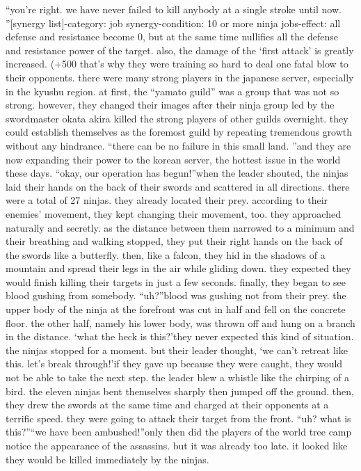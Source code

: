 “you’re right.
 we have never failed to kill anybody at a single stroke until now.
”[synergy list]-category: job synergy-condition: 10 or more ninja jobs-effect: all defense and resistance become 0, but at the same time nullifies all the defense and resistance power of the target.
 also, the damage of the ‘first attack’ is greatly increased.
 (+500%
 that’s why they were training so hard to deal one fatal blow to their opponents.
there were many strong players in the japanese server, especially in the kyushu region.
at first, the “yamato guild” was a group that was not so strong.
however, they changed their images after their ninja group led by the swordmaster okata akira killed the strong players of other guilds overnight.
 they could establish themselves as the foremost guild by repeating tremendous growth without any hindrance.
“there can be no failure in this small land.
”and they are now expanding their power to the korean server, the hottest issue in the world these days.
“okay, our operation has begun!”when the leader shouted, the ninjas laid their hands on the back of their swords and scattered in all directions.
there were a total of 27 ninjas.
 they already located their prey.
 according to their enemies’ movement, they kept changing their movement, too.
 they approached naturally and secretly.
as the distance between them narrowed to a minimum and their breathing and walking stopped, they put their right hands on the back of the swords like a butterfly.
 then, like a falcon, they hid in the shadows of a mountain and spread their legs in the air while gliding down.
they expected they would finish killing their targets in just a few seconds.
finally, they began to see blood gushing from somebody.
“uh?”blood was gushing not from their prey.
 the upper body of the ninja at the forefront was cut in half and fell on the concrete floor.
 the other half, namely his lower body, was thrown off and hung on a branch in the distance.
‘what the heck is this?’they never expected this kind of situation.
 the ninjas stopped for a moment.
but their leader thought, ‘we can’t retreat like this.
 let’s break through!’if they gave up because they were caught, they would not be able to take the next step.
the leader blew a whistle like the chirping of a bird.
 the eleven ninjas bent themselves sharply then jumped off the ground.
 then, they drew the swords at the same time and charged at their opponents at a terrific speed.
 they were going to attack their target from the front.
“uh? what is this?”“we have been ambushed!”only then did the players of the world tree camp notice the appearance of the assassins.
but it was already too late.
 it looked like they would be killed immediately by the ninjas.


